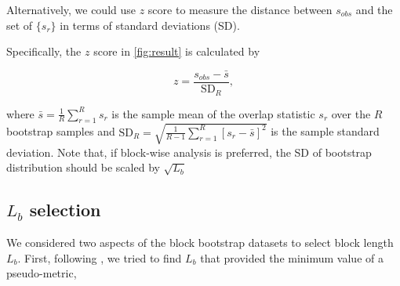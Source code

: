 \documentclass{article}
\begin{document}
Alternatively, we could use $z$ score to measure the
distance between $s_{obs}$ and the
set of $\{s_r\}$ in terms of standard deviations (SD).

Specifically, the
$z$ score in \cref{fig:result} is calculated by

$$ z = \frac{s_{obs} - \bar{s}}{ \text{SD}_R },$$

where
$\bar{s} = \frac{1}{R} \sum_{r=1}^R s_r$
is the sample mean of the overlap statistic $s_r$ over the $R$
bootstrap samples and 
$\text{SD}_R = \sqrt{\frac{1}{R-1} \sum_{r=1}^R [s_r - \bar{s}]^2}$ is
the sample standard deviation.
Note that, if block-wise analysis is preferred, the SD of bootstrap
distribution should be scaled by $\sqrt{L_b}$  

\subsection{$L_b$ selection}\label{sec:length}

We considered two aspects of the block bootstrap datasets to select
block length $L_b$.
First, following \citet{bickel2010subsampling}, we tried to find $L_b$
that provided the minimum value of a pseudo-metric,
\end{document}
